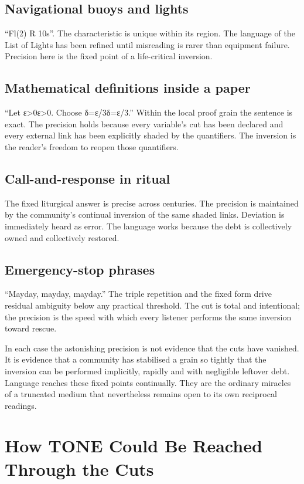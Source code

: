 \documentclass[11pt,a4paper]{article}
\begin{document}
\subsection{Navigational buoys and lights} ``Fl(2) R 10s''. The characteristic is unique within its region. The language of the List of Lights has been refined until misreading is rarer than equipment failure. Precision here is the fixed point of a life-critical inversion.

\subsection{Mathematical definitions inside a paper} ``Let ε>0ε>0. Choose δ=ε/3δ=ε/3.'' Within the local proof grain the sentence is exact. The precision holds because every variable’s cut has been declared and every external link has been explicitly shaded by the quantifiers. The inversion is the reader’s freedom to reopen those quantifiers.

\subsection{Call-and-response in ritual} The fixed liturgical answer is precise across centuries. The precision is maintained by the community’s continual inversion of the same shaded links. Deviation is immediately heard as error. The language works because the debt is collectively owned and collectively restored.

\subsection{Emergency-stop phrases} ``Mayday, mayday, mayday.'' The triple repetition and the fixed form drive residual ambiguity below any practical threshold. The cut is total and intentional; the precision is the speed with which every listener performs the same inversion toward rescue.

In each case the astonishing precision is not evidence that the cuts have vanished. It is evidence that a community has stabilised a grain so tightly that the inversion can be performed implicitly, rapidly and with negligible leftover debt. Language reaches these fixed points continually. They are the ordinary miracles of a truncated medium that nevertheless remains open to its own reciprocal readings.

\section{How TONE Could Be Reached Through the Cuts}
\end{document}
